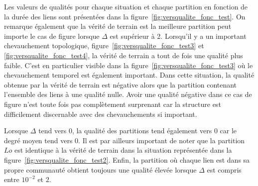 Les valeurs de qualités pour chaque situation et chaque partition en fonction de la durée des liens sont présentées dans la figure~\ref{fig:versqualite_fonc_test}.
On remarque également que la vérité de terrain est la meilleure partition peut importe le cas de figure lorsque $\Delta$ est supérieur à 2.
Lorsqu'il y a un important chevauchement topologique, figure~\ref{fig:versqualite_fonc_test3} et \ref{fig:versqualite_fonc_test4}, la vérité de terrain a tout de fois une qualité plus faible.
C'est en particulier visible dans la figure~\ref{fig:versqualite_fonc_test3} où le chevauchement temporel est également important.
Dans cette situation, la qualité obtenue par la vérité de terrain est négative alors que la partition contenant l'ensemble des liens à une qualité nulle.
Avoir une qualité négative dans ce cas de figure n'est toute fois pas complètement surprenant car la structure est difficilement discernable avec des chevauchements si important.

Lorsque $\Delta$ tend vers $0$, la qualité des partitions tend également vers $0$ car le degré moyen tend vers $0$.
Il est par ailleurs important de noter que la partition $Lo$ est identique à la vérité de terrain dans la situation représentée dans la figure~\ref{fig:versqualite_fonc_test2}.
Enfin, la partition où chaque lien est dans sa propre communauté obtient toujours une qualité élevée lorsque $\Delta$ est compris entre $10^{-2}$ et $2$.


